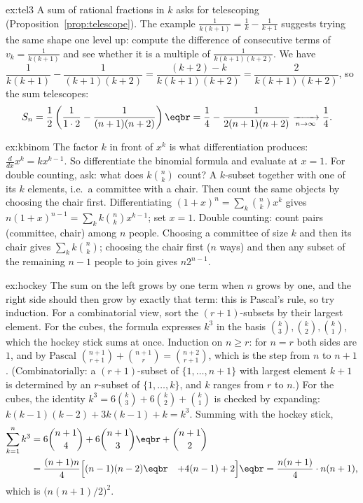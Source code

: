 \begin{solution}{ex:tel3}
\idea A sum of rational fractions in $k$ asks for telescoping (Proposition~\ref{prop:telescope}). The example $\frac1{k(k+1)}=\frac1k-\frac1{k+1}$ suggests trying the same shape one level up: compute the difference of consecutive terms of $v_k=\frac1{k(k+1)}$ and see whether it is a multiple of $\frac1{k(k+1)(k+2)}$.
\writeup We have $\dfrac1{k(k+1)}-\dfrac1{(k+1)(k+2)}=\dfrac{(k+2)-k}{k(k+1)(k+2)}=\dfrac2{k(k+1)(k+2)}$, so the sum telescopes:
\[
\begin{aligned}S_n&=\frac12\left(\frac1{1\cdot2}-\frac1{(n+1)(n+2)}\right)\eqbr=\frac14-\frac1{2(n+1)(n+2)}\xrightarrow[n\to\infty]{}\frac14.\end{aligned}
\]
\end{solution}

\begin{solution}{ex:kbinom}
\idea The factor $k$ in front of $x^k$ is what differentiation produces: $\frac{d}{dx}x^k=kx^{k-1}$. So differentiate the binomial formula and evaluate at $x=1$. For double counting, ask: what does $k\binom nk$ count? A $k$-subset together with one of its $k$ elements, i.e.\ a committee with a chair. Then count the same objects by choosing the chair first.
\writeup Differentiating $(1+x)^n=\sum_k\binom nkx^k$ gives $n(1+x)^{n-1}=\sum_k k\binom nkx^{k-1}$; set $x=1$.
Double counting: count pairs (committee, chair) among $n$ people. Choosing a committee of size $k$ and then
its chair gives $\sum_k k\binom nk$; choosing the chair first ($n$ ways) and then any subset of the
remaining $n-1$ people to join gives $n2^{n-1}$.
\end{solution}

\begin{solution}{ex:hockey}
\idea The sum on the left grows by one term when $n$ grows by one, and the right side should then grow by exactly that term: this is Pascal's rule, so try induction. For a combinatorial view, sort the $(r+1)$-subsets by their largest element. For the cubes, the formula expresses $k^3$ in the basis $\binom k3,\binom k2,\binom k1$, which the hockey stick sums at once.
\writeup Induction on $n\ge r$: for $n=r$ both sides are $1$, and by Pascal
$\binom{n+1}{r+1}+\binom{n+1}{r}=\binom{n+2}{r+1}$, which is the step from $n$ to $n+1$.
(Combinatorially: a $(r+1)$-subset of $\{1,\dots,n+1\}$ with largest element $k+1$ is determined by an
$r$-subset of $\{1,\dots,k\}$, and $k$ ranges from $r$ to $n$.)
For the cubes, the identity $k^3=6\binom k3+6\binom k2+\binom k1$ is checked by expanding:
$k(k-1)(k-2)+3k(k-1)+k=k^3$. Summing with the hockey stick,
\[
\begin{aligned}
\sum_{k=1}^nk^3&=6\binom{n+1}4+6\binom{n+1}3\eqbr+\binom{n+1}2\\
&=\frac{(n+1)n}{4}\Bigl[(n-1)(n-2)\Bigr.\eqbr\Bigl.\quad+4(n-1)+2\Bigr]\eqbr=\frac{n(n+1)}4\cdot n(n+1),
\end{aligned}
\]
which is $\bigl(n(n+1)/2\bigr)^2$.
\end{solution}

